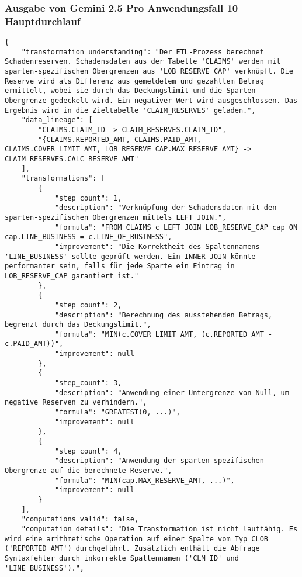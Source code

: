 \subsubsection{Ausgabe von Gemini 2.5 Pro Anwendungsfall 10 Hauptdurchlauf}\label{anhang:subsubsec:gemini_case10_prompt1}
\begin{lstlisting}[caption={Ausgabe: Gemini 2.5 Pro Anwendungsfall 10 Hauptdurchlauf},label={gemini_case10_prompt1}]
{
    "transformation_understanding": "Der ETL-Prozess berechnet Schadenreserven. Schadensdaten aus der Tabelle 'CLAIMS' werden mit sparten-spezifischen Obergrenzen aus 'LOB_RESERVE_CAP' verknüpft. Die Reserve wird als Differenz aus gemeldetem und gezahltem Betrag ermittelt, wobei sie durch das Deckungslimit und die Sparten-Obergrenze gedeckelt wird. Ein negativer Wert wird ausgeschlossen. Das Ergebnis wird in die Zieltabelle 'CLAIM_RESERVES' geladen.",
    "data_lineage": [
        "CLAIMS.CLAIM_ID -> CLAIM_RESERVES.CLAIM_ID",
        "{CLAIMS.REPORTED_AMT, CLAIMS.PAID_AMT, CLAIMS.COVER_LIMIT_AMT, LOB_RESERVE_CAP.MAX_RESERVE_AMT} -> CLAIM_RESERVES.CALC_RESERVE_AMT"
    ],
    "transformations": [
        {
            "step_count": 1,
            "description": "Verknüpfung der Schadensdaten mit den sparten-spezifischen Obergrenzen mittels LEFT JOIN.",
            "formula": "FROM CLAIMS c LEFT JOIN LOB_RESERVE_CAP cap ON cap.LINE_BUSINESS = c.LINE_OF_BUSINESS",
            "improvement": "Die Korrektheit des Spaltennamens 'LINE_BUSINESS' sollte geprüft werden. Ein INNER JOIN könnte performanter sein, falls für jede Sparte ein Eintrag in LOB_RESERVE_CAP garantiert ist."
        },
        {
            "step_count": 2,
            "description": "Berechnung des ausstehenden Betrags, begrenzt durch das Deckungslimit.",
            "formula": "MIN(c.COVER_LIMIT_AMT, (c.REPORTED_AMT - c.PAID_AMT))",
            "improvement": null
        },
        {
            "step_count": 3,
            "description": "Anwendung einer Untergrenze von Null, um negative Reserven zu verhindern.",
            "formula": "GREATEST(0, ...)",
            "improvement": null
        },
        {
            "step_count": 4,
            "description": "Anwendung der sparten-spezifischen Obergrenze auf die berechnete Reserve.",
            "formula": "MIN(cap.MAX_RESERVE_AMT, ...)",
            "improvement": null
        }
    ],
    "computations_valid": false,
    "computation_details": "Die Transformation ist nicht lauffähig. Es wird eine arithmetische Operation auf einer Spalte vom Typ CLOB ('REPORTED_AMT') durchgeführt. Zusätzlich enthält die Abfrage Syntaxfehler durch inkorrekte Spaltennamen ('CLM_ID' und 'LINE_BUSINESS').",

\end{lstlisting}
